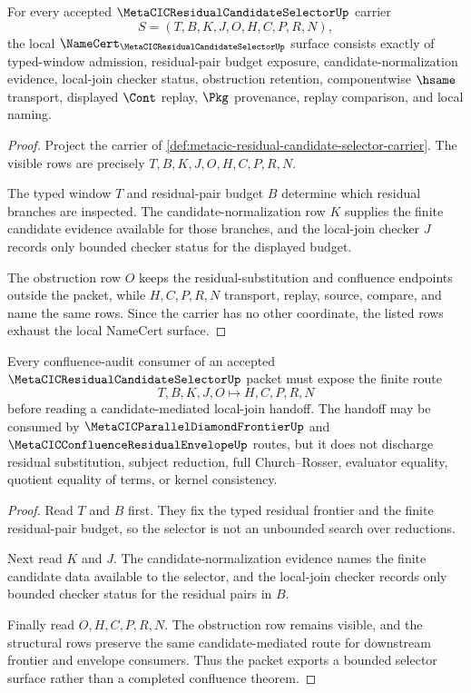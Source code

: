 \begin{theorem}
\label{thm:metacic-residual-candidate-selector-namecert-obligations}
For every accepted $\MetaCICResidualCandidateSelectorUp$ carrier
$$
S=(T,B,K,J,O,H,C,P,R,N),
$$
the local $\NameCert_{\MetaCICResidualCandidateSelectorUp}$ surface consists exactly of typed-window admission, residual-pair budget exposure, candidate-normalization evidence, local-join checker status, obstruction retention, componentwise $\hsame$ transport, displayed $\Cont$ replay, $\Pkg$ provenance, replay comparison, and local naming.
\end{theorem}
\begin{proof}
Project the carrier of \autoref{def:metacic-residual-candidate-selector-carrier}. The visible rows are precisely $T,B,K,J,O,H,C,P,R,N$.

The typed window $T$ and residual-pair budget $B$ determine which residual branches are inspected. The candidate-normalization row $K$ supplies the finite candidate evidence available for those branches, and the local-join checker $J$ records only bounded checker status for the displayed budget.

The obstruction row $O$ keeps the residual-substitution and confluence endpoints outside the packet, while $H,C,P,R,N$ transport, replay, source, compare, and name the same rows. Since the carrier has no other coordinate, the listed rows exhaust the local NameCert surface.
\end{proof}

\begin{theorem}
\label{thm:metacic-residual-candidate-selector-frontier-route}
Every confluence-audit consumer of an accepted $\MetaCICResidualCandidateSelectorUp$ packet must expose the finite route
$$
T,B,K,J,O \longmapsto H,C,P,R,N
$$
before reading a candidate-mediated local-join handoff. The handoff may be consumed by $\MetaCICParallelDiamondFrontierUp$ and $\MetaCICConfluenceResidualEnvelopeUp$ routes, but it does not discharge residual substitution, subject reduction, full Church--Rosser, evaluator equality, quotient equality of terms, or kernel consistency.
\end{theorem}
\begin{proof}
Read $T$ and $B$ first. They fix the typed residual frontier and the finite residual-pair budget, so the selector is not an unbounded search over reductions.

Next read $K$ and $J$. The candidate-normalization evidence names the finite candidate data available to the selector, and the local-join checker records only bounded checker status for the residual pairs in $B$.

Finally read $O,H,C,P,R,N$. The obstruction row remains visible, and the structural rows preserve the same candidate-mediated route for downstream frontier and envelope consumers. Thus the packet exports a bounded selector surface rather than a completed confluence theorem.
\end{proof}

